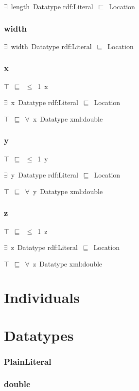 \documentclass{article}
\begin{document}
\ensuremath{\exists}~length~Datatype rdf:Literal~\ensuremath{\sqsubseteq}~Location

\subsubsection*{width}

\ensuremath{\exists}~width~Datatype rdf:Literal~\ensuremath{\sqsubseteq}~Location

\subsubsection*{x}

\ensuremath{\top}~\ensuremath{\sqsubseteq}~\ensuremath{\leq}~1~x

\ensuremath{\exists}~x~Datatype rdf:Literal~\ensuremath{\sqsubseteq}~Location

\ensuremath{\top}~\ensuremath{\sqsubseteq}~\ensuremath{\forall}~x~Datatype xml:double

\subsubsection*{y}

\ensuremath{\top}~\ensuremath{\sqsubseteq}~\ensuremath{\leq}~1~y

\ensuremath{\exists}~y~Datatype rdf:Literal~\ensuremath{\sqsubseteq}~Location

\ensuremath{\top}~\ensuremath{\sqsubseteq}~\ensuremath{\forall}~y~Datatype xml:double

\subsubsection*{z}

\ensuremath{\top}~\ensuremath{\sqsubseteq}~\ensuremath{\leq}~1~z

\ensuremath{\exists}~z~Datatype rdf:Literal~\ensuremath{\sqsubseteq}~Location

\ensuremath{\top}~\ensuremath{\sqsubseteq}~\ensuremath{\forall}~z~Datatype xml:double

\section*{Individuals}\section*{Datatypes}\subsubsection*{PlainLiteral}

\subsubsection*{double}
\end{document}
